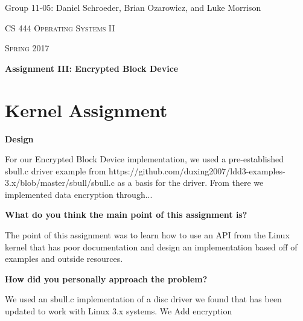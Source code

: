 \documentclass[10pt,letterpaper,draftclsnofoot,onecolumn]{IEEEtran}
\begin{document}
\begin{titlepage}
\centering
{\Large Group 11-05: Daniel Schroeder, Brian Ozarowicz, and Luke Morrison\par}
\vspace{1cm}
{\scshape\Large CS 444 Operating Systems II\par}
{\scshape\Large Spring 2017\par}
\vspace{1cm}
{\huge\bfseries Assignment III: Encrypted Block Device\par}
\vspace{2cm}
\begin{abstract}
This document is a summary of Assignment 3 for CS 444 Operating Systems II at Oregon State University Spring 2017. This document includes the design and implementation of the kernel assignment to implement an Encrypted Block Device, responses to the design and implimenation questions for the kernel and concurrency assignments, and a work log.
\end{abstract}
\end{titlepage}

\section{Kernel Assignment}
\bigskip

\noindent\textbf{Design}
\medskip

\medskip

\noindent For our Encrypted Block Device implementation, we used a pre-established sbull.c driver example from {https://github.com/duxing2007/ldd3-examples-3.x/blob/master/sbull/sbull.c} as a basis for the driver. From there we implemented data encryption through...

\bigskip

\noindent\textbf{What do you think the main point of this assignment is?}
\medskip

\medskip

\noindent The point of this assignment was to learn how to use an API from the Linux kernel that has poor documentation and design an implementation based off of examples and outside resources.
\bigskip

\noindent\textbf{How did you personally approach the problem?}
\medskip

\medskip

\noindent We used an sbull.c implementation of a disc driver we found that has been updated to work with Linux 3.x systems. We {Add encryption} 
\medskip
\end{document}
